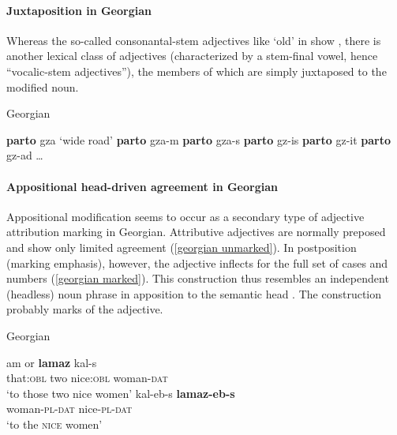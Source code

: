 \paragraph*{Juxtaposition in Georgian}
Whereas the so-called consonantal-stem adjectives like ‘old’ in  show , there is another lexical class of adjectives (characterized by a stem-final vowel, hence “vocalic-stem adjectives”), the members of which are simply juxtaposed to the modified noun.
\begin{exe}
\settowidth{}
\ex \rm{Georgian \citep[236]{aronson1991}}
\begin{xlist}
\ex \textbf{parto} gza	\rm{‘wide road’}		
\ex \textbf{parto} gza-m				
\ex \textbf{parto} gza-s				
\ex \textbf{parto} gz-is				
\ex \textbf{parto} gz-it				
\ex \textbf{parto} gz-ad				
\ex \dots
\end{xlist}
\end{exe}

\paragraph*{Appositional head\hyp{}driven agreement in Georgian}
Appositional modification seems to occur as a secondary type of adjective attribution marking in Georgian. Attributive adjectives are normally preposed and show only limited agreement (\ref{georgian unmarked}). In postposition (marking emphasis), however, the adjective inflects for the full set of cases and numbers (\ref{georgian marked}). This construction thus resembles an independent (headless) noun phrase in apposition to the semantic head \citep[652, 677]{testelec1998}. The construction probably marks  of the adjective.
\begin{exe}
\ex \rm{Georgian \citep[652]{testelec1998}}
\begin{xlist}
\ex 
\label{georgian unmarked}
\gll	am or \textbf{lamaz} kal-s\\
	that:\textsc{obl} two nice:\textsc{obl} woman-\textsc{dat}\\
\glt	‘to those two nice women’
\ex 
\label{georgian marked}
\gll	kal-eb-s \textbf{lamaz-eb-s}\\
	woman-\textsc{pl}-\textsc{dat} nice-\textsc{pl}-\textsc{dat}\\
\glt	‘to the \textsc{nice} women’
\end{xlist}
\end{exe}

